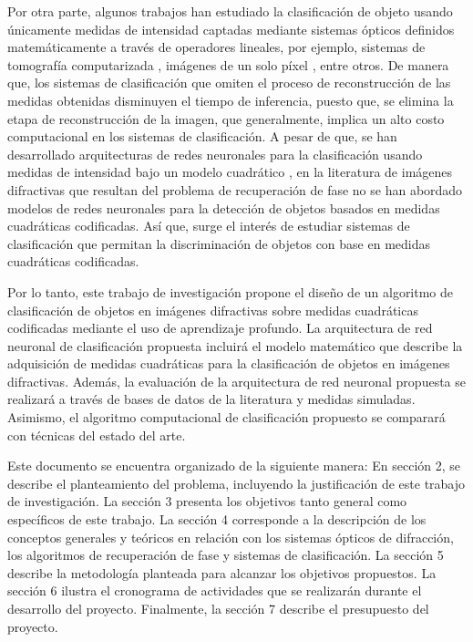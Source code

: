 Por otra parte, algunos trabajos han estudiado la clasificación de objeto usando únicamente medidas de intensidad captadas mediante sistemas ópticos definidos matemáticamente a través de operadores lineales, por ejemplo, sistemas de tomografía computarizada , imágenes de un solo píxel , entre otros. De manera que, los sistemas de clasificación que omiten el proceso de reconstrucción de las medidas obtenidas disminuyen el tiempo de inferencia, puesto que, se elimina la etapa de reconstrucción de la imagen, que generalmente, implica un alto costo computacional en los sistemas de clasificación. A pesar de que, se han desarrollado arquitecturas de redes neuronales para la clasificación usando medidas de intensidad bajo un modelo cuadrático , en la literatura de imágenes difractivas que resultan del problema de recuperación de fase no se han abordado modelos de redes neuronales para la detección de objetos basados en medidas cuadráticas codificadas. Así que, surge el interés de estudiar sistemas de clasificación que permitan la discriminación de objetos con base en medidas cuadráticas codificadas.

Por lo tanto, este trabajo de investigación propone el diseño de un algoritmo de clasificación de objetos en imágenes difractivas sobre medidas cuadráticas codificadas mediante el uso de aprendizaje profundo. La arquitectura de red neuronal de clasificación propuesta incluirá el modelo matemático que describe la adquisición de medidas cuadráticas para la clasificación de objetos en imágenes difractivas. Además, la evaluación de la arquitectura de red neuronal propuesta se realizará a través de bases de datos de la literatura y medidas simuladas. Asimismo, el algoritmo computacional de clasificación propuesto se comparará con técnicas del estado del arte.


Este documento se encuentra organizado de la siguiente manera: En sección 2, se describe el planteamiento del problema, incluyendo la justificación de este trabajo de investigación. La sección 3 presenta los objetivos tanto general como específicos de este trabajo. La sección 4 corresponde a la descripción de los conceptos generales y teóricos en relación con los sistemas ópticos de difracción, los algoritmos de recuperación de fase y sistemas de clasificación. La sección 5 describe la metodología planteada para alcanzar los objetivos propuestos. La sección 6 ilustra el cronograma de actividades que se realizarán durante el desarrollo del proyecto. Finalmente, la sección 7 describe el presupuesto del proyecto. 


